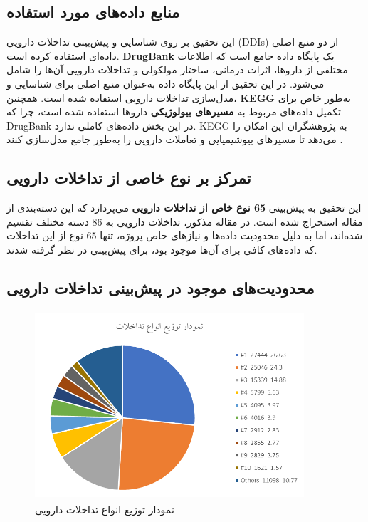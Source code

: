 \subsection{منابع داده‌های مورد استفاده}
این تحقیق بر روی شناسایی و پیش‌بینی تداخلات دارویی (DDIs) از دو منبع اصلی داده‌ای استفاده کرده است. \textbf{DrugBank} یک پایگاه داده جامع است که اطلاعات مختلفی از داروها، اثرات درمانی، ساختار مولکولی و تداخلات دارویی آن‌ها را شامل می‌شود. در این تحقیق از این پایگاه داده به‌عنوان منبع اصلی برای شناسایی و مدل‌سازی تداخلات دارویی استفاده شده است. همچنین، \textbf{KEGG} به‌طور خاص برای تکمیل داده‌های مربوط به \textbf{مسیرهای بیولوژیکی} داروها استفاده شده است، چرا که DrugBank در این بخش داده‌های کاملی ندارد. KEGG به پژوهشگران این امکان را می‌دهد تا مسیرهای بیوشیمیایی و تعاملات دارویی را به‌طور جامع مدل‌سازی کنند \cite{ref_kegg, ref_drugbank}.

\subsection{تمرکز بر نوع خاصی از تداخلات دارویی}
این تحقیق به پیش‌بینی \textbf{65 نوع خاص از تداخلات دارویی} می‌پردازد که این دسته‌بندی از مقاله \cite{ref_ryu2018} استخراج شده‌ است. در مقاله مذکور، تداخلات دارویی به 86 دسته مختلف تقسیم شده‌اند، اما به دلیل محدودیت داده‌ها و نیازهای خاص پروژه، تنها 65 نوع از این تداخلات که داده‌های کافی برای آن‌ها موجود بود، برای پیش‌بینی در نظر گرفته شدند.

\subsection{محدودیت‌های موجود در پیش‌بینی تداخلات دارویی}

\begin{figure}[t]
	\centering
	\includegraphics[height=7cm,width=10cm]{images/image1-1.png}
	\caption{ نمودار توزیع انواع تداخلات دارویی }
	\label{image1-1}
	\centering
\end{figure}

